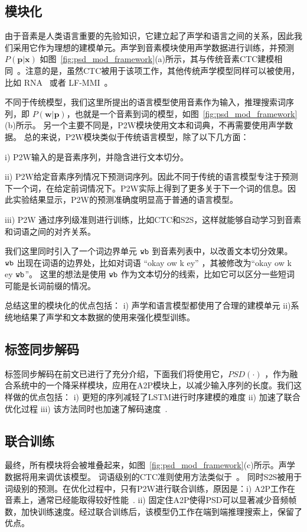 \subsection{模块化}
\label{sec:psd_mod_modu}
由于音素是人类语言重要的先验知识，它建立起了声学和语言之间的关系，因此我们采用它作为理想的建模单元。声学到音素模块使用声学数据进行训练，并预测 $P(\mathbf{p}|\mathbf{x})$ 如图~\ref{fig:psd_mod_framework}(a)所示，其与传统音素CTC建模相同~\cite{miao2015eesen}。注意的是，虽然CTC被用于该项工作，其他传统声学模型同样可以被使用，比如 RNA~\cite{sak2017recurrent} 或者 LF-MMI~\cite{povey2016purely}。

不同于传统模型，我们这里所提出的语言模型使用音素作为输入，推理搜索词序列，即 $P(\mathbf{w}|\mathbf{p})$，也就是一个音素到词的模型，如图~\ref{fig:psd_mod_framework}(b)所示。
另一个主要不同是，P2W模块使用文本和词典，不再需要使用声学数据。
总的来说，P2W模块类似于传统语言模型，除了以下几方面：

i) P2W输入的是音素序列，并隐含进行文本切分。

ii) P2W给定音素序列情况下预测词序列。因此不同于传统的语言模型专注于预测下一个词，在给定前词情况下。P2W实际上得到了更多关于下一个词的信息。因此实验结果显示，P2W的预测准确度明显高于普通的语言模型。

iii) P2W 通过序列级准则进行训练，比如CTC和S2S，这样就能够自动学习到音素和词语之间的对齐关系。


我们这里同时引入了一个词边界单元 $\tt wb$ 到音素列表中，以改善文本切分效果。 $\tt wb$ 出现在词语的边界处，比如对词语 ``okay ow k ey'' ，其被修改为``okay ow k ey $\tt wb$''。 这里的想法是使用 $\tt wb$ 作为文本切分的线索，比如它可以区分一些短词可能是长词前缀的情况。

总结这里的模块化的优点包括： i) 声学和语言模型都使用了合理的建模单元 ii)系统地结果了声学和文本数据的使用来强化模型训练。


\subsection{标签同步解码}
\label{sec:psd_mod_psd}
标签同步解码在前文已进行了充分介绍，下面我们将使用它，$PSD(\cdot)$ ，作为融合系统中的一个降采样模块，应用在A2P模块上，以减少输入序列的长度。我们这样做的优点包括： i) 更短的序列减轻了LSTM进行时序建模的难度 ii)  加速了联合优化过程 iii) 该方法同时也加速了解码速度~\cite{zhc00-chen-tasl2017}.


\subsection{联合训练}
\label{sec:psd_mod_joint}
最终，所有模块将会被堆叠起来，如图~\ref{fig:psd_mod_framework}(c)所示。声学数据将用来调优该模型。
词语级别的CTC准则使用方法类似于~\cite{soltau2016neural}。
同时S2S被用于词级别的预测。在优化过程中，只有P2W进行联合训练，原因是：i) A2P工作在音素上，通常已经能取得较好性能~\cite{miao2015eesen,sak2015fast}. ii) 固定住A2P使得PSD可以显著减少音频帧数，加快训练速度。经过联合训练后，该模型仍工作在端到端推理搜索上，保留了优点。
%



